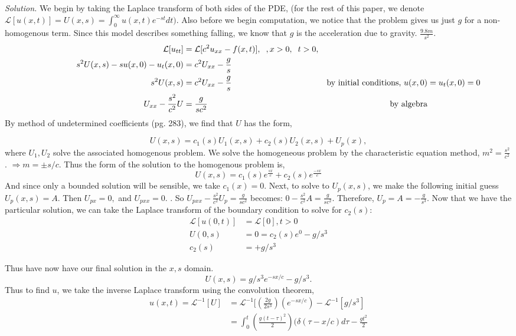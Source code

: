 \documentclass{article}
\begin{document}
\vspace{3mm}
\textit{Solution.} We begin by taking the Laplace transform of both sides of the PDE, (for the rest of this paper, we denote \(\mathcal{L} [ u(x,t) ] = U(x,s) = \int_0^{\infty} u(x,t)e^{-st} dt )\). Also before we begin computation, we notice that the problem gives us just \(g\) for a non-homogenous term. Since this model describes something falling, we know that \(g\) is the acceleration due to gravity. \(\frac{9.8m}{s^2}.\)
\begin{align*}
&& \mathcal{L}[ u_{tt} ]&= \mathcal{L} [c^2u_{xx} - f(x,t)],  \hspace{2mm}, x>0, \hspace{2mm} t>0,  &&\\
\hspace{17mm}&& s^2 U(x,s) - su(x,0)-u_t(x,0) &= c^2U_{xx} - \frac{g}{s} && \\
&& s^2 U(x,s)  &= c^2U_{xx} -\frac{g}{s}   &\text{by initial conditions, }u(x,0) &= u_t(x,0) = 0&  \\
&&U_{xx} - \frac{s^2}{c^2} U      &= \frac{g}{sc^2}      &\text{ by  algebra}& \\
\end{align*}
By method of undetermined coefficients (pg. 283), we find that \(U\) has the form,

\[
U(x,s) = c_1(s) U_1(x,s) + c_2(s) U_2(x,s)+ U_p(x),
\]
where \(U_1, U_2\) solve the associated homogenous problem. 
We solve the homogeneous problem by the characteristic equation method, \(m^2 = \frac{s^2}{c^2}\). \( \Rightarrow  m = \pm s/c \). Thus the form of the solution to the homogenous problem is, 
\[
U(x,s) = c_1(s) e^{\frac{sx}{c}} + c_2(s) e^{\frac{-sx}{c}} 
\]
And since only a bounded solution will be sensible, we take \(c_1(x) = 0\). Next, to solve to \(U_p(x,s)\), we make the following initial guess \(U_p(x,s) = A \). Then \( U_{px}=0,\) and \(  U_{pxx}=0.  \) .  So \(U_{pxx} - \frac{s^2}{c^2} U_p= \frac{g}{sc^2} \) becomes: \( 0 - \frac{s^2}{c^2} A = \frac{g}{sc^2}\). Therefore, \(U_p = A = -\frac{g}{s^3} \). Now that we have the particular solution, we can take the Laplace transform of the boundary condition to solve for \(c_2(s)\):
\begin{align*}
\mathcal{L}[ u(0,t)]&= \mathcal{L}[0], t>0  \\
U(0,s) &= 0 = c_2(s)e^0 - g/s^3 \\
c_2(s) &= +g/s^3
\end{align*}

Thus have now have our final solution in the \(x,s\) domain. 
\[
U(x,s) = g/s^3 e^{-sx/c} - g/s^3.
\]
Thus to find \(u\), we take the inverse Laplace transform using the convolution theorem, 
\begin{align*}
u(x,t) = \mathcal{L}^{-1} [U] &= \mathcal{L}^{-1}[ (\frac{2g}{2s^3 } )(e^{-sx/c}) -\mathcal{L}^{-1}[g/s^3]\\
&= \int_0^t ( \frac{g(t-\tau)^2}{2 } )( \delta(\tau- x/c) d\tau  - \frac{ gt^2 }{2}
\end{align*}
\end{document}

